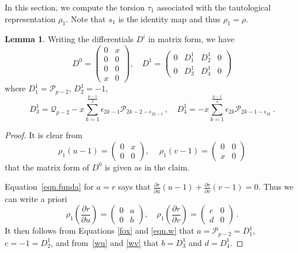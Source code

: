 \documentclass{amsart}
\def\calP{\mathcal{P}}
\def\calQ{\mathcal{Q}}
\theoremstyle{definition}
\newtheorem{Lemma}[Theorem]{Lemma}
\begin{document}
In this section, we compute the torsion $\tau_1$ associated with the tautological representation $\rho_1$. Note that $s_1$ is the identity map and thus $\rho_1=\rho$.

\begin{Lemma} 
    \label{lem.DD}
    Writing the differentials $D^i$ in matrix form,  we have
    $$D^0=\left(\begin{array}{cc}0 &x \\ 0& 0 \\ \hline 0 & 0 \\ x & 0 \end{array}\right),\quad D^1=\left(\begin{array}{cc|cc}0& D^{1}_{1} & D^1_{2} & 0\\ 0 & D^1_{3} & D^1_{4} & 0\end{array}\right)$$
    where  $D^1_{1}=\calP_{p-2}$, $D^1_{2}=-1$, 
    \begin{equation*}
        D^1_{3}=\calQ_{p-2}-x\sum_{k=1}^{\frac{p-1}{2}}\epsilon_{2k-1}\calP_{2k-2-\epsilon_{2k-1}} \,, \quad D^1_{4}=-x\sum_{k=1}^{\frac{p-1}{2}}\epsilon_{2k}\calP_{2k-1-\epsilon_{2k}} \, .
    \end{equation*}
\end{Lemma}
\begin{proof}
    It is clear from
    \begin{equation*}
        \rho_1(u-1) = \begin{pmatrix}
            0 & x \\ 0 & 0
        \end{pmatrix}, \quad \,
        \rho_1(v-1) = \begin{pmatrix}
            0 & 0 \\ x & 0
        \end{pmatrix}
    \end{equation*}
    that the matrix form of $D^0$ is given as in the claim.
    
    Equation~\eqref{eqn.funda} for $a=r$ says that  $\frac{\partial r}{\partial u}(u-1)+\frac{\partial r}{\partial v}(v-1)=0$. Thus we can write a priori
    $$\rho_1 \left(\frac{\partial r}{\partial u}\right)=\begin{pmatrix} 0 & a \\ 0 & b\end{pmatrix}, \quad \rho_1\left(\frac{\partial r}{\partial v}\right)=\begin{pmatrix} c & 0 \\ d & 0\end{pmatrix} \, .$$
    It then follows from Equations \eqref{fox} and \eqref{eqn.w} that $a=\calP_{p-2}=D^1_{1}$, $c=-1=D^1_{2}$, and from~\eqref{wu} and \eqref{wv} that $b=D^1_{3}$ and $d=D^1_{4}$.
\end{proof}
\end{document}
